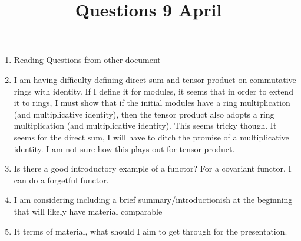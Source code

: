 \documentclass[12]{amsart}
\title{Questions 9 April}
\begin{document}
\maketitle

\begin{enumerate}
\item Reading Questions from other document

\item I am having difficulty defining direct sum and tensor product on commutative rings with identity. If I define it for modules, it seems that in order to extend it to rings, I must show that if the initial modules have a ring multiplication (and multiplicative identity), then the tensor product also adopts a ring multiplication (and multiplicative identity). This seems tricky though. It seems for the direct sum, I will have to ditch the promise of a multiplicative identity. I am not sure how this plays out for tensor product.

\item Is there a good introductory example of a functor? For a covariant functor, I can do a forgetful functor.

\item I am considering including a brief summary/introductionish at the beginning that will likely have material comparable 

\item It terms of material, what should I aim to get through for the presentation.

\end{enumerate}
\end{document}
